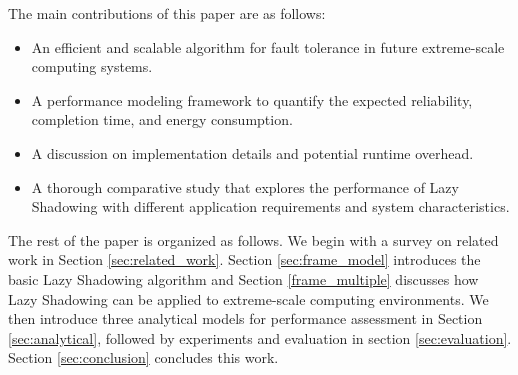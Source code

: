 The main contributions of this paper are as follows:
\begin{itemize}
	\item An efficient and scalable algorithm for fault tolerance in future extreme-scale computing systems.
    \item A performance modeling framework to quantify the expected reliability, completion time, and energy consumption.
    \item A discussion on implementation details and potential runtime overhead.
	\item A thorough comparative study that explores the performance of Lazy Shadowing with different application requirements and system characteristics.
\end{itemize}


The rest of the paper is organized as follows. We begin with a survey on related work in Section 
\ref{sec:related_work}. Section \ref{sec:frame_model} introduces the basic Lazy Shadowing algorithm and Section \ref{frame_multiple} discusses how Lazy Shadowing can be applied to 
extreme-scale computing environments. 
We then introduce three analytical models for performance assessment
in Section \ref{sec:analytical}, 
followed by experiments and evaluation in
section \ref{sec:evaluation}. Section \ref{sec:conclusion} concludes this work.%
